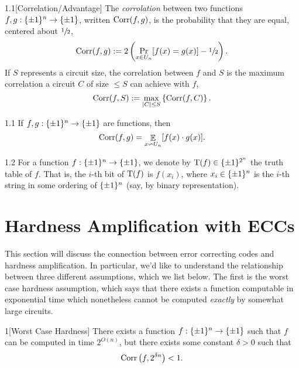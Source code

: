 \documentclass[11pt]{article}
\begin{document}
\begin{definition}{1.1}[Correlation/Advantage] 
    The \emph{corrolation} between two functions $f, g : \{\pm 1\}^n \rightarrow \{\pm 1\}$, written $\mathrm{Corr}(f, g)$, is the probability that they are equal, centered about $\sfrac{1}{2}$, 
    \begin{equation*}
        \mathrm{Corr}(f, g) := 2 \left(\Pr_{x \in U_n}[f(x) = g(x)] - \sfrac{1}{2}\right).
    \end{equation*} 
    If $S$ represents a circuit size, the correlation between $f$ and $S$ is the maximum correlation a circuit $C$ of size $\leq S$ can achieve with $f$, 
    \begin{equation*}
        \mathrm{Corr}(f, S) := \max_{|C| \leq S} \left\{\mathrm{Corr}(f, C)\right\}.
    \end{equation*}
\end{definition}

\begin{fact}{1.1}
    If $f, g : \{\pm 1\}^n \rightarrow \{\pm 1\}$ are functions, then 
    \begin{equation*}
        \mathrm{Corr}(f, g) = \mathop{\mathbb{E}}_{x \backsim U_n} [f(x) \cdot g(x)].
    \end{equation*}
\end{fact}

\begin{definition}{1.2}
    For a function $f : \{\pm 1\}^n \rightarrow \{\pm 1\}$, we denote by $\mathrm{T}(f) \in \{\pm 1\}^{2^n}$ the truth table of $f$. That is, the $i$-th bit of $\mathrm{T}(f)$ is $f(x_i)$, where $x_i \in \{\pm 1\}^n$ is the $i$-th string in some ordering of $\{\pm 1\}^n$ (say, by binary representation).
\end{definition}


\section{Hardness Amplification with ECCs}

This section will discuss the connection between error correcting codes and hardness amplification. In particular, we'd like to understand the relationship between three different assumptions, which we list below. The first is the worst case hardness assumption, which says that there exists a function computable in exponential time which nonetheless cannot be computed \emph{exactly} by somewhat large circuits.

\begin{assumption}{1}[Worst Case Hardness] \label{a-1}
    There exists a function $f : \{\pm 1\}^n \rightarrow \{\pm 1\}$ such that $f$ can be computed in time $2^{O(n)}$, but there exists some constant $\delta > 0$ such that 
    \begin{equation*}
        \mathrm{Corr}\left(f, 2^{\delta n}\right) < 1.
    \end{equation*}
\end{assumption}
\end{document}
